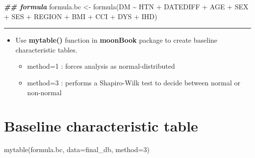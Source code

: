 \documentclass[
]{book}
\newenvironment{Shaded}{\begin{snugshade}}{\end{snugshade}}
\newcommand{\AttributeTok}[1]{\textcolor[rgb]{0.77,0.63,0.00}{#1}}
\newcommand{\DecValTok}[1]{\textcolor[rgb]{0.00,0.00,0.81}{#1}}
\newcommand{\DocumentationTok}[1]{\textcolor[rgb]{0.56,0.35,0.01}{\textbf{\textit{#1}}}}
\newcommand{\FunctionTok}[1]{\textcolor[rgb]{0.00,0.00,0.00}{#1}}
\newcommand{\NormalTok}[1]{#1}
\newcommand{\OtherTok}[1]{\textcolor[rgb]{0.56,0.35,0.01}{#1}}
\newcommand{\SpecialCharTok}[1]{\textcolor[rgb]{0.00,0.00,0.00}{#1}}
\providecommand{\tightlist}{%
  \setlength{\itemsep}{0pt}\setlength{\parskip}{0pt}}
\theoremstyle{definition}
\theoremstyle{definition}
\theoremstyle{definition}
\theoremstyle{definition}
\theoremstyle{remark}
\begin{document}
\begin{Shaded}
\begin{Highlighting}[]
\DocumentationTok{\#\# formula}
\NormalTok{formula.bc }\OtherTok{\textless{}{-}} \FunctionTok{formula}\NormalTok{(DM }\SpecialCharTok{\textasciitilde{}}\NormalTok{ HTN }\SpecialCharTok{+}\NormalTok{ DATEDIFF }\SpecialCharTok{+}\NormalTok{ AGE }\SpecialCharTok{+}\NormalTok{ SEX }\SpecialCharTok{+}\NormalTok{ SES }\SpecialCharTok{+}\NormalTok{ REGION }\SpecialCharTok{+}\NormalTok{ BMI }\SpecialCharTok{+}\NormalTok{ CCI }\SpecialCharTok{+}\NormalTok{ DYS }\SpecialCharTok{+}\NormalTok{ IHD)}
\end{Highlighting}
\end{Shaded}

\begin{center}\rule{0.5\linewidth}{0.5pt}\end{center}

\begin{itemize}
\tightlist
\item
  Use \textbf{mytable()} function in \textbf{moonBook} package to create baseline characteristic tables.

  \begin{itemize}
  \tightlist
  \item
    method=1 : forces analysis as normal-distributed\\
  \item
    method=3 : performs a Shapiro-Wilk test to decide between normal or non-normal
  \end{itemize}
\end{itemize}

\hypertarget{baseline-characteristic-table-1}{%
\section{Baseline characteristic table}\label{baseline-characteristic-table-1}}

\begin{Shaded}
\begin{Highlighting}[]
\FunctionTok{mytable}\NormalTok{(formula.bc, }\AttributeTok{data=}\NormalTok{final\_db, }\AttributeTok{method=}\DecValTok{3}\NormalTok{) }
\end{Highlighting}
\end{Shaded}
\end{document}
